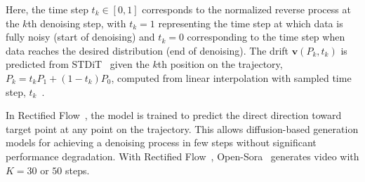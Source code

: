 \noindent Here, the time step $t_{k} {\in} [0,1]$ corresponds to the normalized reverse process at the $k$th denoising step, with $t_{k} {=} 1$ representing the time step at which data is fully noisy (start of denoising) and $t_{k} {=} 0$ corresponding to the time step when data reaches the desired distribution (end of denoising). The drift $\boldsymbol{v}(P_k,t_k)$ is predicted from STDiT~\cite{opensora} given the $k$th position on the trajectory, $P_{k} = t_k P_1 + (1 - t_k) P_0$, computed from linear interpolation with sampled time step, $t_{k}$~\cite{liu2022flow}.




In Rectified Flow~\cite{liu2022flow}, the model is trained to predict the direct direction toward target point at any point on the trajectory. This allows diffusion-based generation models for achieving a denoising process in few steps without significant performance degradation. 
With Rectified Flow~\cite{liu2022flow}, Open-Sora~\cite{opensora} generates video with $K=30$ or $50$ steps.%

